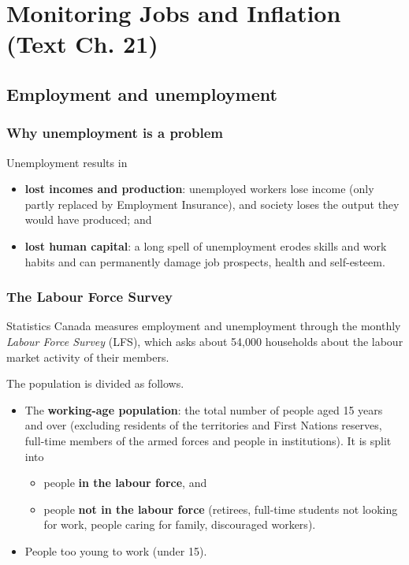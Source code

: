 \chapter{Monitoring Jobs and Inflation (Text Ch. 21)}

\section{Employment and unemployment}

\subsection{Why unemployment is a problem}

Unemployment results in
\begin{itemize}
  \item \textbf{lost incomes and production}: unemployed workers lose income (only
        partly replaced by Employment Insurance), and society loses the output they would
        have produced; and
  \item \textbf{lost human capital}: a long spell of unemployment erodes skills and
        work habits and can permanently damage job prospects, health and self-esteem.
\end{itemize}

\subsection{The Labour Force Survey}

Statistics Canada measures employment and unemployment through the monthly \emph{Labour
Force Survey} (LFS), which asks about 54{,}000 households about the labour market
activity of their members.

The population is divided as follows.
\begin{itemize}
  \item The \textbf{working-age population}: the total number of people aged 15 years and
        over (excluding residents of the territories and First Nations reserves, full-time
        members of the armed forces and people in institutions). It is split into
        \begin{itemize}
          \item people \textbf{in the labour force}, and
          \item people \textbf{not in the labour force} (retirees, full-time students not
                looking for work, people caring for family, discouraged workers).
        \end{itemize}
  \item People too young to work (under 15).
\end{itemize}

